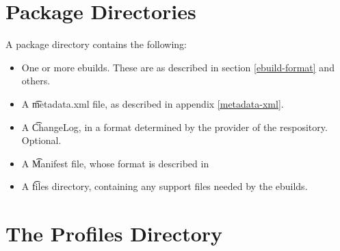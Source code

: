 \section{Package Directories}
\label{package-dirs}

A package directory contains the following:
\begin{itemize}
\item One or more ebuilds. These are as described in section \ref{ebuild-format} and others.
\item A \t{metadata.xml} file, as described in appendix \ref{metadata-xml}.
\item A \t{ChangeLog}, in a format determined by the provider of the respository. Optional.
\item A \t{Manifest} file, whose format is described in \cite{Glep44}
\item A \t{files} directory, containing any support files needed by the ebuilds.
\end{itemize}

\section{The Profiles Directory}
\label{profiles-dir}

